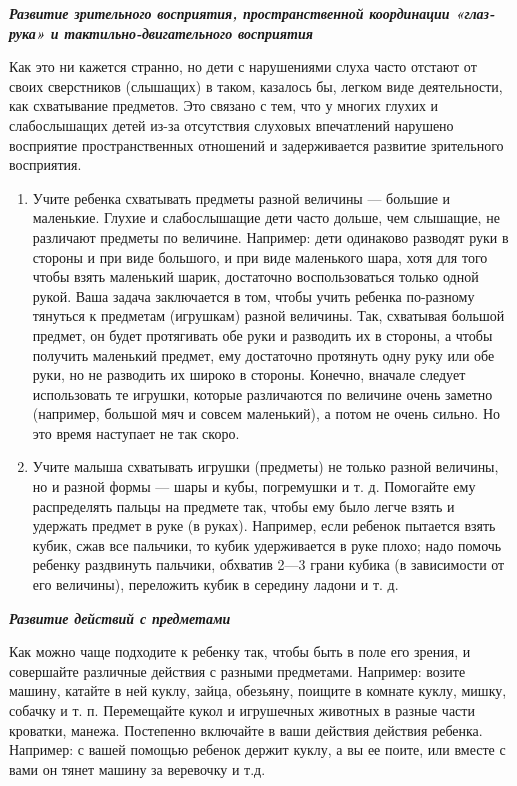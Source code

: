 \documentclass[a5paper]{book}
\renewcommand{\emph}[1]{\textit{#1}}
\begin{document}
\emph{\textbf{Развитие зрительного восприятия, пространственной
координации «глаз-рука» и тактильно-двигательного восприятия}}

Как это ни кажется странно, но дети с нарушениями слуха часто отстают от
своих сверстников (слышащих) в таком, казалось бы, легком виде
деятельности, как схватывание предметов. Это связано с тем, что у многих
глухих и слабослышащих детей из-за отсутствия слуховых впечатлений
нарушено восприятие пространственных отношений и задерживается развитие
зрительного восприятия.


\begin{enumerate}
\def\labelenumi{\arabic{enumi}.}
\item
  
  Учите ребенка схватывать предметы разной величины --- большие и
  маленькие. Глухие и слабослышащие дети часто дольше, чем слышащие, не
  различают предметы по величине. Например: дети одинаково разводят руки
  в стороны и при виде большого, и при виде маленького шара, хотя для
  того чтобы взять маленький шарик, достаточно воспользоваться только
  одной рукой. Ваша задача заключается в том, чтобы учить ребенка
  по-разному тянуться к предметам (игрушкам) разной величины. Так,
  схватывая большой предмет, он будет протягивать обе руки и разводить
  их в стороны, а чтобы получить маленький предмет, ему достаточно
  протянуть одну руку или обе руки, но не разводить их широко в стороны.
  Конечно, вначале следует использовать те игрушки, которые различаются
  по величине очень заметно (например, большой мяч и совсем маленький),
  а потом не очень сильно. Но это время наступает не так скоро.
  
\item
  
  Учите малыша схватывать игрушки (предметы) не только разной величины,
  но и разной формы --- шары и кубы, погремушки и т. д. Помогайте ему
  распределять пальцы на предмете так, чтобы ему было легче взять и
  удержать предмет в руке (в руках). Например, если ребенок пытается
  взять кубик, сжав все пальчики, то кубик удерживается в руке плохо;
  надо помочь ребенку раздвинуть пальчики, обхватив 2---3 грани кубика
  (в зависимости от его величины), переложить кубик в середину ладони и
  т. д.
  
\end{enumerate}


\emph{\textbf{Развитие действий с предметами}}

Как можно чаще подходите к ребенку так, чтобы быть в поле его зрения, и
совершайте различные действия с разными предметами. Например: возите
машину, катайте в ней куклу, зайца, обезьяну, поищите в комнате куклу,
мишку, собачку и т. п. Перемещайте кукол и игрушечных животных в разные
части кроватки, манежа. Постепенно включайте в ваши действия действия
ребенка. Например: с вашей помощью ребенок держит куклу, а вы ее поите,
или вместе с вами он тянет машину за веревочку и т.д.
\end{document}
